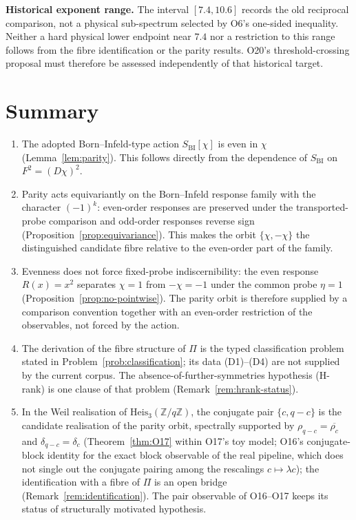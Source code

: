 \documentclass[11pt,a4paper]{article}
\newcommand{\Heis}{\mathrm{Heis}_{3}(\mathbb{Z}/q\mathbb{Z})}
\newcommand{\Proj}{\Pi}
\newcommand{\chifield}{\chi}
\newcommand{\rhoc}{\rho_{c}}
\newcommand{\rhoqc}{\rho_{q-c}}
\begin{document}
    \textbf{Historical exponent range.}
    The interval $[7.4,10.6]$ records the old reciprocal comparison, not a physical sub-spectrum
    selected by O6's one-sided inequality.
    Neither a hard physical lower endpoint near $7.4$ nor a restriction to this range follows
    from the fibre identification or the parity results.
    O20's threshold-crossing proposal must therefore be assessed independently of that historical target.

  \section{Summary}
  \label{sec:summary}

  \begin{enumerate}
    \item The adopted Born--Infeld-type action $S_{\mathrm{BI}}[\chifield]$ is even in $\chifield$
    (Lemma~\ref{lem:parity}).
    This follows directly from the dependence of $S_{\mathrm{BI}}$ on $F^2 = (D\chifield)^2$.

    \item Parity acts equivariantly on the Born--Infeld response family with the
    character $(-1)^{k}$: even-order responses are preserved under the transported-probe
    comparison and odd-order responses reverse sign
    (Proposition~\ref{prop:equivariance}).
    This makes the orbit $\{\chifield, -\chifield\}$ the distinguished candidate fibre
    relative to the even-order part of the family.

    \item Evenness does not force fixed-probe indiscernibility: the even response
    $R(x) = x^{2}$ separates $\chifield = 1$ from $-\chifield = -1$ under the common probe
    $\eta = 1$ (Proposition~\ref{prop:no-pointwise}).
    The parity orbit is therefore supplied by a comparison convention together with an
    even-order restriction of the observables, not forced by the action.

    \item The derivation of the fibre structure of $\Proj$ is the typed classification
    problem stated in Problem~\ref{prob:classification}; its data (D1)--(D4) are not
    supplied by the current corpus.
    The absence-of-further-symmetries hypothesis (H-rank) is one clause of that problem
    (Remark~\ref{rem:hrank-status}).

    \item In the Weil realisation of $\Heis$, the conjugate pair $\{c, q-c\}$ is the
    candidate realisation of the parity orbit, spectrally supported by
    $\rhoqc = \overline{\rhoc}$ and $\delta_{q-c} = \delta_c$
    (Theorem~\ref{thm:O17} within O17's toy model; O16's conjugate-block identity for the exact block
    observable of the real pipeline, which does not single out the conjugate pairing among the
    rescalings $c \mapsto \lambda c$); the identification with a fibre of $\Proj$ is an open bridge
    (Remark~\ref{rem:identification}).
    The pair observable of O16--O17 keeps its status of structurally motivated hypothesis.
  \end{enumerate}

  
      
\end{document}
